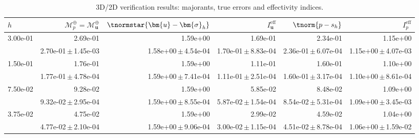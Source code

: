 \begin{table}
\centering
\caption{3D/2D verification results: majorants, true errors and effectivity indices.}
\label{tab:verification_majorant}
\begin{tabular}{lrrrrr}
\toprule
$h$ & $\mathcal{M}^\oplus_p=\mathcal{M}^\oplus_{\bm{u}}$ & $\tnormstar{\bm{u} - \bm{\sigma}_h}$ & $I_{\bm{u}}^{\mathrm{eff}}$ & $\tnorm{p - s_h}$ & $I_p^{\mathrm{eff}}$ \\
\midrule
\multirow{2}{*}{3.00e-01} & 2.69e-01 & 1.59e+00 & 1.69e-01 & 2.34e-01 & 1.15e+00 \\
 & 2.70e-01\,$\pm$\,1.45e-03 & 1.58e+00\,$\pm$\,4.54e-04 & 1.70e-01\,$\pm$\,8.83e-04 & 2.36e-01\,$\pm$\,6.07e-04 & 1.15e+00\,$\pm$\,4.07e-03 \\
\midrule
\multirow{2}{*}{1.50e-01} & 1.76e-01 & 1.59e+00 & 1.11e-01 & 1.60e-01 & 1.10e+00 \\
 & 1.77e-01\,$\pm$\,4.78e-04 & 1.59e+00\,$\pm$\,7.41e-04 & 1.11e-01\,$\pm$\,2.51e-04 & 1.60e-01\,$\pm$\,3.17e-04 & 1.10e+00\,$\pm$\,8.61e-04 \\
\midrule
\multirow{2}{*}{7.50e-02} & 9.28e-02 & 1.59e+00 & 5.85e-02 & 8.48e-02 & 1.09e+00 \\
 & 9.32e-02\,$\pm$\,2.95e-04 & 1.59e+00\,$\pm$\,8.55e-04 & 5.87e-02\,$\pm$\,1.54e-04 & 8.54e-02\,$\pm$\,5.31e-04 & 1.09e+00\,$\pm$\,3.45e-03 \\
\midrule
\multirow{2}{*}{3.75e-02} & 4.75e-02 & 1.59e+00 & 2.99e-02 & 4.59e-02 & 1.04e+00 \\
 & 4.77e-02\,$\pm$\,2.10e-04 & 1.59e+00\,$\pm$\,9.06e-04 & 3.00e-02\,$\pm$\,1.15e-04 & 4.51e-02\,$\pm$\,8.78e-04 & 1.06e+00\,$\pm$\,1.59e-02 \\
\bottomrule
\end{tabular}
\end{table}
